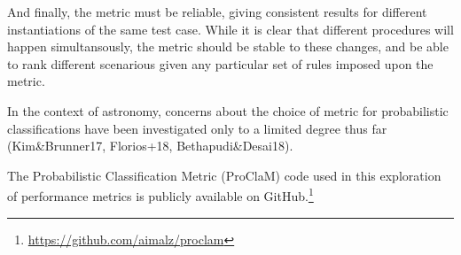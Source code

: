 And finally, the metric must be reliable, giving consistent results for different instantiations of the same test case.
While it is clear that different procedures will happen simultansously, the metric should be stable to these changes, and be able to rank different scenarious given any particular set of rules imposed upon the metric.

In the context of astronomy, concerns about the choice of metric for probabilistic classifications have been investigated only to a limited degree thus far (Kim\&Brunner17, Florios+18, Bethapudi\&Desai18).

The Probabilistic Classification Metric (ProClaM) code used in this exploration of performance metrics is publicly available on GitHub.\footnote{\url{https://github.com/aimalz/proclam}}
